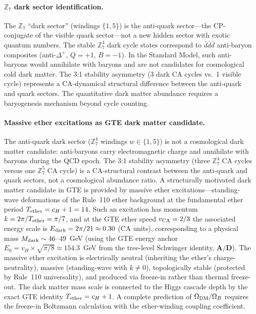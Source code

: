 \documentclass[11pt]{article}
\newcommand{\CatAD}{\textbf{A/D}}
\begin{document}
\paragraph{$\mathbb{Z}_7$ dark sector identification.}
The $\mathbb{Z}_7$ ``dark sector'' (windings $\{1,5\}$) is the anti-quark sector---the
CP-conjugate of the visible quark sector---not a new hidden sector with exotic quantum
numbers. The stable $\mathbb{Z}_7^4$ dark cycle states correspond to
$\bar{d}\bar{d}\bar{d}$ anti-baryon composites (anti-$\Delta^+$, $Q=+1$, $B=-1$). In
the Standard Model, such anti-baryons would annihilate with baryons and are not
candidates for cosmological cold dark matter. The 3:1 stability asymmetry (3 dark CA
cycles vs.\ 1 visible cycle) represents a CA-dynamical structural difference between the
anti-quark and quark sectors. The quantitative dark matter abundance requires a
baryogenesis mechanism beyond cycle counting.

\paragraph{Massive ether excitations as GTE dark matter candidate.}
The anti-quark dark sector ($\mathbb{Z}_7^4$ windings $w \in \{1,5\}$) is not a
cosmological dark matter candidate: anti-baryons carry electromagnetic charge and
annihilate with baryons during the QCD epoch. The 3:1 stability asymmetry (three
$\mathbb{Z}_7^4$ CA cycles versus one $\mathbb{Z}_7^5$ CA cycle) is a CA-structural
contrast between the anti-quark and quark sectors, not a cosmological abundance ratio.
A structurally motivated dark matter candidate in GTE is provided by massive ether
excitations---standing-wave deformations of the Rule~110 ether background at the
fundamental ether period $T_{\rm ether} = c_H + 1 = 14$. Such an excitation has
momentum $k = 2\pi/T_{\rm ether} = \pi/7$, and at the GTE ether speed $v_{\rm CA} =
2/3$ the associated energy scale is $E_{\rm dark} = 2\pi/21 \approx 0.30$ (CA units),
corresponding to a physical mass $M_{\rm dark} \sim 46$--$49$~GeV (using the GTE energy
anchor $E_0 = v_H \times \sqrt{\pi/8} \approx 154.3$~GeV from the tree-level Schwinger
identity, $\CatAD$). The massive ether excitation is electrically neutral (inheriting the
ether's charge-neutrality), massive (standing-wave with $k \neq 0$), topologically
stable (protected by Rule~110 universality), and produced via freeze-in rather than
thermal freeze-out. The dark matter mass scale is connected to the Higgs cascade depth
by the exact GTE identity $T_{\rm ether} = c_H + 1$. A complete prediction of
$\Omega_{\rm DM}/\Omega_B$ requires the freeze-in Boltzmann calculation with the
ether-winding coupling coefficient.
\end{document}
